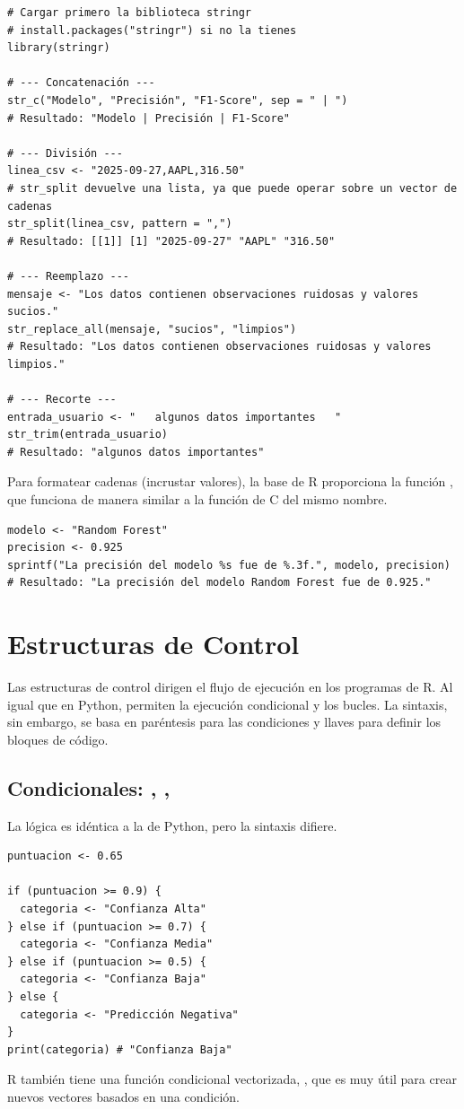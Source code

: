 \begin{example}
\text{ }\begin{verbatim}
# Cargar primero la biblioteca stringr
# install.packages("stringr") si no la tienes
library(stringr)

# --- Concatenación ---
str_c("Modelo", "Precisión", "F1-Score", sep = " | ")
# Resultado: "Modelo | Precisión | F1-Score"

# --- División ---
linea_csv <- "2025-09-27,AAPL,316.50"
# str_split devuelve una lista, ya que puede operar sobre un vector de cadenas
str_split(linea_csv, pattern = ",")
# Resultado: [[1]] [1] "2025-09-27" "AAPL" "316.50"

# --- Reemplazo ---
mensaje <- "Los datos contienen observaciones ruidosas y valores sucios."
str_replace_all(mensaje, "sucios", "limpios")
# Resultado: "Los datos contienen observaciones ruidosas y valores limpios."

# --- Recorte ---
entrada_usuario <- "   algunos datos importantes   "
str_trim(entrada_usuario)
# Resultado: "algunos datos importantes"
\end{verbatim}
\end{example}

Para formatear cadenas (incrustar valores), la base de R proporciona la función , que funciona de manera similar a la función de C del mismo nombre.

\begin{verbatim}
modelo <- "Random Forest"
precision <- 0.925
sprintf("La precisión del modelo %s fue de %.3f.", modelo, precision)
# Resultado: "La precisión del modelo Random Forest fue de 0.925."
\end{verbatim}

\section{Estructuras de Control}
\label{sec:r_control_structures}
Las estructuras de control dirigen el flujo de ejecución en los programas de R. Al igual que en Python, permiten la ejecución condicional y los bucles. La sintaxis, sin embargo, se basa en paréntesis para las condiciones y llaves \rcode{\{\}} para definir los bloques de código.

\subsection*{Condicionales: , , }
La lógica es idéntica a la de Python, pero la sintaxis difiere.
\begin{verbatim}
puntuacion <- 0.65

if (puntuacion >= 0.9) {
  categoria <- "Confianza Alta"
} else if (puntuacion >= 0.7) {
  categoria <- "Confianza Media"
} else if (puntuacion >= 0.5) {
  categoria <- "Confianza Baja"
} else {
  categoria <- "Predicción Negativa"
}
print(categoria) # "Confianza Baja"
\end{verbatim}
R también tiene una función condicional vectorizada, , que es muy útil para crear nuevos vectores basados en una condición.

